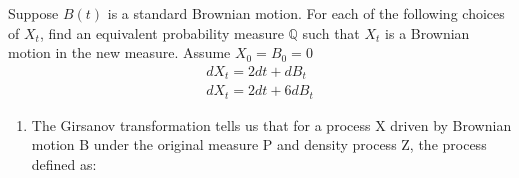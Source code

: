 \documentclass[12pt,a4paper]{exam}
\begin{document}
\begin{questions}
\begin{solution}
\begin{solution}
\question Suppose $B(t)$ is a standard Brownian motion. For each of the following choices of $X_t$, find an equivalent probability measure $\mathbb{Q}$ such that $X_t$ is a Brownian motion in the new measure. Assume $X_0=B_0=0$
\begin{equation*}
\begin{gathered}
dX_t = 2dt + dB_t\\
dX_t = 2dt + 6dB_t
\end{gathered}
\end{equation*}

\fillwithlines{3cm}
\begin{solution}
\begin{enumerate}[label=(\alph*),font=\itshape]
\item The Girsanov transformation tells us that for a process X driven by Brownian motion B under the original measure P and density process Z, the process defined as:

%
%
%
%
%
%
%
%
%
%
%
%
%
\end{enumerate}
\end{solution}


\end{solution}
\end{solution}
\end{questions}
\end{document}
